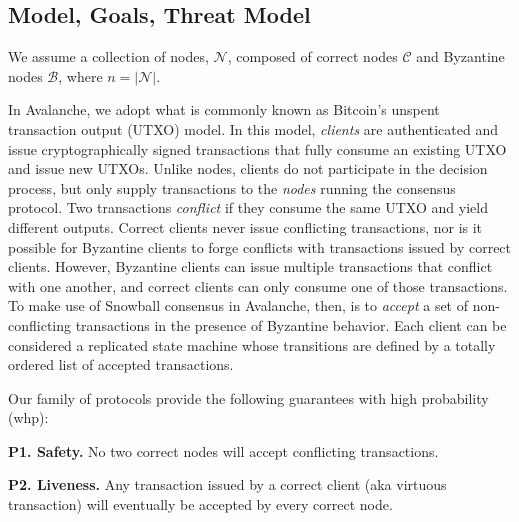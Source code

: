\documentclass[letterpaper,twocolumn,10pt]{article}
\newcommand{\tronly}[2]{#1}
\newcommand{\editinsert}[1]{{\color{blue}#1}}
\newcommand{\editchange}[1]{{\color{orange}#1}}
\theoremstyle{definition}
\begin{document}
\subsection{Model, Goals, Threat Model}\tronly{}{\vspace{-0.5em}}

We assume a collection of nodes, $\mathcal{N}$,
composed of correct nodes $\mathcal{C}$ and
Byzantine nodes $\mathcal{B}$, where $n = |\mathcal{N}|$.

\editinsert{In Avalanche}, we adopt what is commonly known as
Bitcoin's unspent transaction output (UTXO) model.
In this model,
\emph{clients} are authenticated and issue cryptographically signed
transactions that fully consume an existing UTXO and issue new UTXOs.
Unlike nodes, clients do not participate in the decision process, but only
supply transactions to the \emph{nodes} running the consensus protocol.
Two transactions \emph{conflict} if
they consume the same UTXO and yield different outputs.
Correct clients never issue conflicting transactions, nor is it possible
for Byzantine clients to forge conflicts with transactions
issued by correct clients.
However, Byzantine clients can issue multiple transactions that conflict
with one another, and correct clients can only consume one of
those transactions.
\editchange{To make use of Snowball consensus in Avalanche}, then, is to \emph{accept} a
set of non-conflicting transactions in the presence of Byzantine behavior.
Each client can be considered a replicated state machine whose
transitions are defined by a totally ordered list of accepted transactions.

Our family of protocols provide the following guarantees with high probability (whp):
\begin{compactitem}

    \item \textbf{P1. Safety.} No two correct nodes will accept conflicting transactions.

    \item \textbf{P2. Liveness.} Any transaction issued by a correct client (aka virtuous transaction) will eventually be accepted by every correct node.
\end{compactitem}
\end{document}
